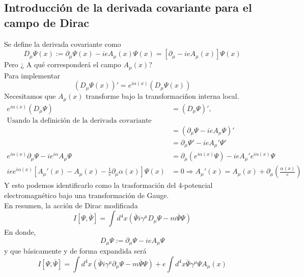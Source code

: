 \documentclass[../main.tex]{subfiles}
\begin{document}
  \subsection{Introducción de la derivada covariante para el campo de Dirac}
  Se define la derivada covariante como
  \begin{equation}
    D_\mu \Psi(x) := \partial_\mu \Psi(x) - i eA_\mu(x) \Psi(x) = \left[ \partial_\mu - ieA_\mu(x) \right] \Psi(x)
   \end{equation}
   Pero ¿ A qué corresponderá el campo $A_\mu(x)$? \\
   Para implementar
   \begin{equation*}
     \left( D_\mu \Psi(x) \right)'  = e^{i\alpha(x)} \left( D_\mu \Psi(x) \right)
   \end{equation*}
   Necesitamos que $A_\mu(x)$ transforme bajo la transformaciñon interna local.
   \begin{align*}
     e^{i\alpha(x)} \left( D_\mu \Psi \right) & = \left( D_\mu \Psi \right)',\\
    \text{Usando la definición de la derivada covariante} \\
     & = \left( \partial_\mu \Psi - ieA_\mu \Psi \right)' \\
     & = \partial_\mu \Psi' - ie A_\mu' \Psi' \\
     e^{i\alpha(x)} \partial_\mu \Psi - ie^{i\alpha} A_\mu\Psi  & = \partial_\mu \left( e^{i\alpha(x)} \Psi \right) - ieA_\mu'e^{i\alpha(x)} \Psi \\
     iee^{i\alpha(x)} \left[ A_\mu'(x) - A_\mu(x) - \frac{1}{e} \partial_\mu\alpha(x) \right] \Psi(x) & = 0 \Rightarrow A_\mu'(x) = A_\mu(x) + \partial_\mu \left( \frac{\alpha(x)}{e}  \right)
   \end{align*}
  Y esto podemos identificarlo como la trasformación del 4-potencial electromagnético bajo una transformación de Gauge. \\
  En resumen, la acción de Dirac modificada
  \begin{equation}
  I[\Psi,\bar{\Psi}] = \int d^4x \left(\bar{\Psi}i\gamma^\mu D_\mu \Psi - m\bar{\Psi}\Psi\right)
   \end{equation}
   En donde,
   \begin{equation}
     D_\mu \Psi := \partial_\mu\Psi - ieA_\mu \Psi
    \end{equation}
  y que básicamente y de forma expandida será
  \begin{equation*}
    I[\Psi,\bar{\Psi}] = \int d^4x \left( \bar{\Psi}i\gamma^\mu \partial_\mu \Psi - m\bar{\Psi}\Psi \right) + e\int d^4x \bar{\Psi} \gamma^\mu \Psi A_\mu(x)
  \end{equation*}
\end{document}
